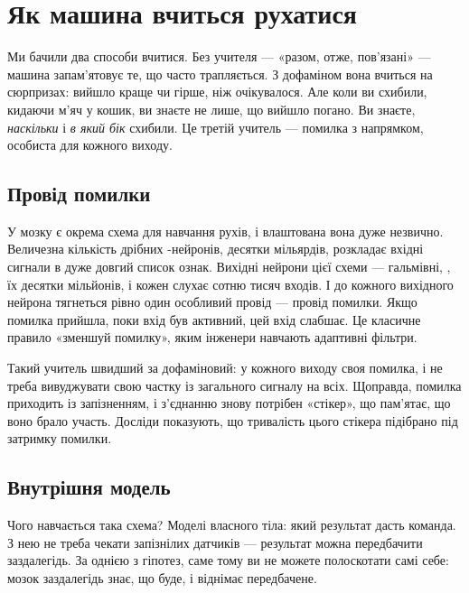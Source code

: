 \chapter{Як машина вчиться рухатися}

Ми бачили два способи вчитися. Без учителя --- «разом, отже, пов'язані» --- машина запам'ятовує те, що часто трапляється. З дофаміном вона вчиться на сюрпризах: вийшло краще чи гірше, ніж очікувалося. Але коли ви схибили, кидаючи м'яч у кошик, ви знаєте не лише, що вийшло погано. Ви знаєте, \emph{наскільки} і \emph{в який бік} схибили. Це третій учитель --- помилка з напрямком, особиста для кожного виходу.

\section*{Провід помилки}

У мозку є окрема схема для навчання рухів, і влаштована вона дуже незвично. Величезна кількість дрібних -нейронів, десятки мільярдів, розкладає вхідні сигнали в дуже довгий список ознак. Вихідні нейрони цієї схеми --- гальмівні, , їх десятки мільйонів, і кожен слухає сотню тисяч входів. І до кожного вихідного нейрона тягнеться рівно один особливий провід --- провід помилки. Якщо помилка прийшла, поки вхід був активний, цей вхід слабшає. Це класичне правило «зменшуй помилку», яким інженери навчають адаптивні фільтри.


Такий учитель швидший за дофаміновий: у кожного виходу своя помилка, і не треба вивуджувати свою частку із загального сигналу на всіх. Щоправда, помилка приходить із запізненням, і з'єднанню знову потрібен «стікер», що пам'ятає, що воно брало участь. Досліди показують, що тривалість цього стікера підібрано під затримку помилки.

\section*{Внутрішня модель}

Чого навчається така схема? Моделі власного тіла: який результат дасть команда. З нею не треба чекати запізнілих датчиків --- результат можна передбачити заздалегідь. За однією з гіпотез, саме тому ви не можете полоскотати самі себе: мозок заздалегідь знає, що буде, і віднімає передбачене.

